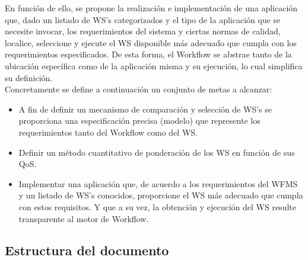 En función de ello, se propone la realización e implementación de una aplicación que, dado un listado de WS's categorizados y el tipo de la aplicación que se necesite invocar, los requerimientos del sistema y ciertas normas de calidad, localice, seleccione y ejecute el WS disponible  más adecuado que cumpla con los requerimientos especificados. De esta forma, el Workflow se abstrae tanto de la ubicación específica como de la aplicación misma y su ejecución, lo cual simplifica su definición.\\

Concretamente se define a continuación un conjunto de metas a alcanzar:
\begin{itemize}
	\item A fin de definir un mecanismo de comparación y selección de WS's se proporciona una especificación precisa (modelo) que represente los requerimientos tanto del Workflow como del WS.
	
	\item Definir un método cuantitativo de ponderación de los WS en función de sus QoS.
	
	\item Implementar una aplicación que, de acuerdo a los requerimientos del WFMS y un listado de WS's conocidos, proporcione el WS más adecuado que cumpla con estos requisitos. Y que a su vez, la obtención y ejecución del WS resulte transparente al motor de Workflow.
	
\end{itemize}

\subsection{Estructura del documento}
\label{Estructura del documento}

